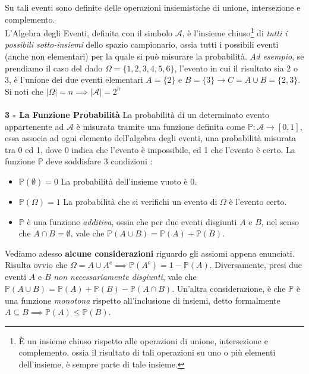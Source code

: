 \documentclass[12pt, letterpaper]{article}
\begin{document}
Su tali eventi sono definite delle operazioni insiemistiche di unione, intersezione e complemento.\\
L'Algebra degli Eventi, definita con il simbolo \(\mathcal{A} \), è l'insieme chiuso\footnote{
    È un insieme chiuso rispetto alle operazioni di unione, intersezione e complemento, ossia il risultato
    di tali operazioni su uno o più elementi dell'insieme, è sempre parte di tale insieme.
    } 
 di \textit{tutti
i possibili sotto-insiemi} dello spazio campionario, ossia tutti i possibili eventi 
(anche non elementari) per la quale si può misurare la probabilità. 
\textit{Ad esempio}, se prendiamo il caso del dado \(\Omega=\{1,2,3,4,5,6\}\), l'evento
in cui il risultato sia 2 o 3, è l'unione dei due eventi elementari \(A=\{2\}\) e \( B=\{3\} \rightarrow C = A \cup B
= \{2,3\}\). Si noti che \(|\Omega|=n \implies |\mathcal{A}|=2^n\)
\\\hphantom{.}\\\textbf{3 - La Funzione Probabilità}
La probabilità di un determinato evento appartenente ad \(\mathcal{A} \) è misurata tramite una 
funzione definita come \(\mathbb{P} : \mathcal{A} \rightarrow [0,1]\), essa associa ad ogni elemento
dell'algebra degli eventi, una probabilità misurata tra 0 ed 1, dove 0 indica che l'evento è impossibile,
ed 1 che l'evento è certo. La funzione \(\mathbb{P}\) deve soddisfare 3 condizioni :
\begin{itemize}
    \item \(\mathbb{P}(\emptyset )= 0\) La probabilità dell'insieme vuoto è 0.
    \item \(\mathbb{P}(\Omega)= 1\) La probabilità che si verifichi un evento di \(\Omega\) è l'evento certo.
    \item \(\mathbb{P}\) è una funzione \textit{additiva}, ossia che per due eventi disgiunti \(A\) e 
    \(B\), nel senso che \(A\cap B = \emptyset\), vale che \(\mathbb{P}(A\cup B)=\mathbb{P}(A)+\mathbb{P}(B)\).
\end{itemize}
Vediamo adesso \textbf{alcune considerazioni} riguardo gli assiomi appena enunciati.\\
Risulta ovvio che \(\Omega = A\cup A^c \implies \mathbb{P}(A^c)=1-\mathbb{P}(A)\). Diversamente, presi 
due eventi \(A\) e \(B\) \textit{non necessariamente disgiunti}, vale che \(\mathbb{P}(A\cup B)
=\mathbb{P}(A)+\mathbb{P}(B)-\mathbb{P}(A\cap B)\). Un'altra considerazione, è che \(\mathbb{P}\)
 è una funzione \textit{monotona} rispetto all'inclusione di insiemi, detto formalmente 
 \(A \subseteq B \implies \mathbb{P}(A) \le \mathbb{P}(B)\).
\end{document}
